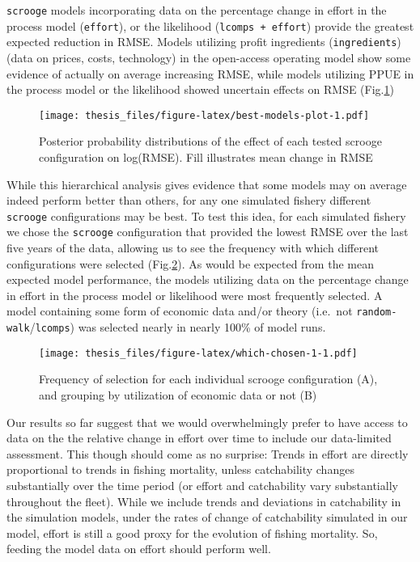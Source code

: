 \documentclass[twoside,12pt,final]{ucthesis-CA2012}
\begin{document}
\begin{ucmainmatter}
\texttt{scrooge} models incorporating data on the percentage change in
effort in the process model (\texttt{effort}), or the likelihood
(\texttt{lcomps\ +\ effort}) provide the greatest expected reduction in
RMSE. Models utilizing profit ingredients (\texttt{ingredients}) (data
on prices, costs, technology) in the open-access operating model show
some evidence of actually on average increasing RMSE, while models
utilizing PPUE in the process model or the likelihood showed uncertain
effects on RMSE (Fig.\ref{fig:best-models-plot})
\begin{figure}
\centering
\texttt{[image: thesis\_files/figure-latex/best-models-plot-1.pdf]}
\caption{\label{fig:best-models-plot}Posterior probability distributions of
the effect of each tested scrooge configuration on log(RMSE). Fill
illustrates mean change in RMSE}
\end{figure}
While this hierarchical analysis gives evidence that some models may on
average indeed perform better than others, for any one simulated fishery
different \texttt{scrooge} configurations may be best. To test this
idea, for each simulated fishery we chose the \texttt{scrooge}
configuration that provided the lowest RMSE over the last five years of
the data, allowing us to see the frequency with which different
configurations were selected (Fig.\ref{fig:which-chosen-1}). As would be
expected from the mean expected model performance, the models utilizing
data on the percentage change in effort in the process model or
likelihood were most frequently selected. A model containing some form
of economic data and/or theory (i.e.~not
\texttt{random-walk}/\texttt{lcomps}) was selected nearly in nearly
100\% of model runs.
\begin{figure}
\centering
\texttt{[image: thesis\_files/figure-latex/which-chosen-1-1.pdf]}
\caption{\label{fig:which-chosen-1}Frequency of selection for each
individual scrooge configuration (A), and grouping by utilization of
economic data or not (B)}
\end{figure}
Our results so far suggest that we would overwhelmingly prefer to have
access to data on the the relative change in effort over time to include
our data-limited assessment. This though should come as no surprise:
Trends in effort are directly proportional to trends in fishing
mortality, unless catchability changes substantially over the time
period (or effort and catchability vary substantially throughout the
fleet). While we include trends and deviations in catchability in the
simulation models, under the rates of change of catchability simulated
in our model, effort is still a good proxy for the evolution of fishing
mortality. So, feeding the model data on effort should perform well.


\end{ucmainmatter}
\end{document}
